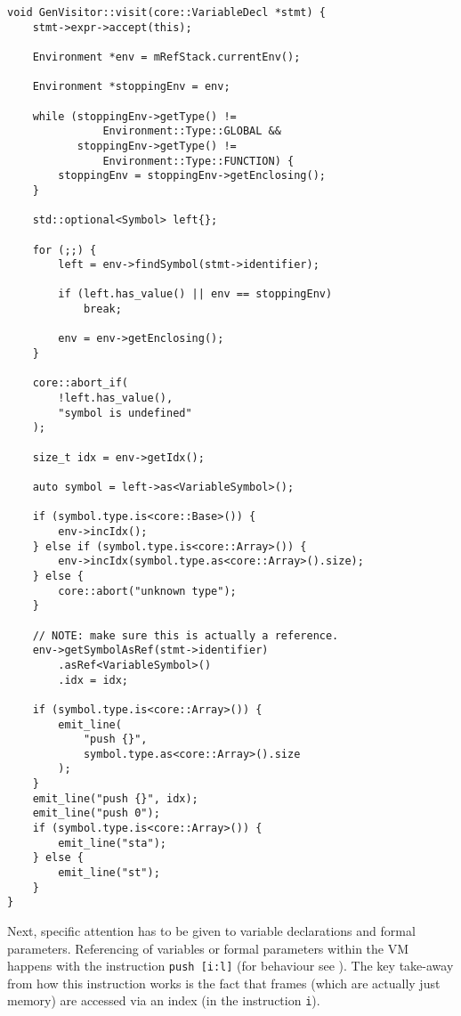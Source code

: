 \begin{lstlisting}[caption={The \texttt{visit(VariableDecl *)}
method in the \texttt{GenVisitor} class
(ir\_gen/GenVisitor.cpp).}, label=lst:formalparam]
void GenVisitor::visit(core::VariableDecl *stmt) {
    stmt->expr->accept(this);

    Environment *env = mRefStack.currentEnv();

    Environment *stoppingEnv = env;

    while (stoppingEnv->getType() !=
               Environment::Type::GLOBAL &&
           stoppingEnv->getType() !=
               Environment::Type::FUNCTION) {
        stoppingEnv = stoppingEnv->getEnclosing();
    }

    std::optional<Symbol> left{};

    for (;;) {
        left = env->findSymbol(stmt->identifier);

        if (left.has_value() || env == stoppingEnv)
            break;

        env = env->getEnclosing();
    }

    core::abort_if(
        !left.has_value(),
        "symbol is undefined"
    );

    size_t idx = env->getIdx();

    auto symbol = left->as<VariableSymbol>();

    if (symbol.type.is<core::Base>()) {
        env->incIdx();
    } else if (symbol.type.is<core::Array>()) {
        env->incIdx(symbol.type.as<core::Array>().size);
    } else {
        core::abort("unknown type");
    }

    // NOTE: make sure this is actually a reference.
    env->getSymbolAsRef(stmt->identifier)
        .asRef<VariableSymbol>()
        .idx = idx;

    if (symbol.type.is<core::Array>()) {
        emit_line(
            "push {}",
            symbol.type.as<core::Array>().size
        );
    }
    emit_line("push {}", idx);
    emit_line("push 0");
    if (symbol.type.is<core::Array>()) {
        emit_line("sta");
    } else {
        emit_line("st");
    }
}
\end{lstlisting}

Next, specific attention has to be given to variable
declarations and formal parameters. Referencing of variables or
formal parameters within the VM happens with the instruction
\mbox{\texttt{push [i:l]}} (for behaviour see
). The key take-away from how this instruction
works is the fact that frames (which are actually just memory)
are accessed via an index (in the instruction \texttt{i}).

